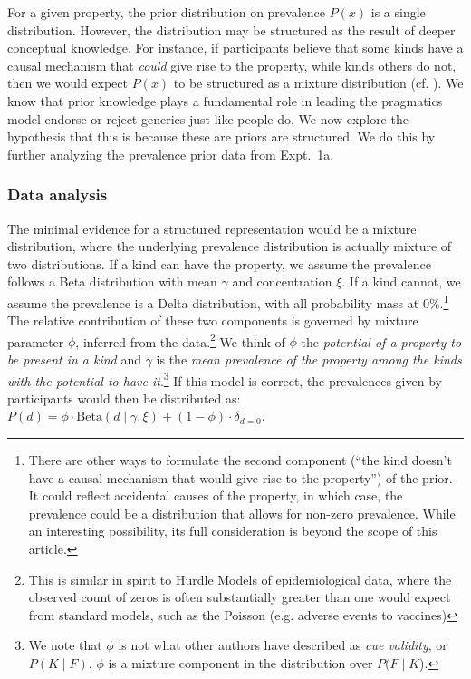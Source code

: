 \documentclass[12pt,letterpaper]{article}
\begin{document}
For a given property,  the prior distribution on prevalence $P(x)$ is a single distribution.
However, the distribution may be structured as the result of deeper conceptual knowledge. 
For instance, if participants believe that some kinds have a causal mechanism that \emph{could} give rise to the property, while kinds others do not, then we would expect $P(x)$ to be structured as a mixture distribution (cf. ).
We know that prior knowledge plays a fundamental role in leading the pragmatics model endorse or reject generics just like people do. 
We now explore the hypothesis that this is because these are priors are structured. 
We do this by further analyzing the prevalence prior data from Expt.~1a.

\subsubsection*{Data analysis}

The minimal evidence for a structured representation would be a mixture distribution, where the underlying prevalence distribution is actually mixture of two distributions. 
If a kind can have the property, we assume the prevalence follows a Beta distribution with mean $\gamma$ and concentration $\xi$. 
If a kind cannot, we assume the prevalence is a Delta distribution, with all probability mass at 0\%.\footnote{There are other ways to formulate the second component (``the kind doesn't have a causal mechanism that would give rise to  the property'') of the prior. 
It could reflect accidental causes of the property, in which case, the prevalence could be a distribution that allows for non-zero prevalence. 
While an interesting possibility, its full consideration is beyond the scope of this article.
}
The relative contribution of these two components is governed by mixture parameter $\phi$, inferred from the data.\footnote{This is similar in spirit to Hurdle Models of epidemiological data, where the observed count of zeros is often substantially greater than one would expect from standard models, such as the Poisson (e.g. adverse events to vaccines)\cite{hurdleModels}}
We think of $\phi$ the \emph{potential of a property to be present in a kind} and $\gamma$ is the \emph{mean prevalence of the property among the kinds with the potential to have it}.\footnote{We note that $\phi$ is not what other authors have described as \emph{cue validity}, or $P(K \mid F)$. 
$\phi$ is a mixture component in the distribution over $P(F\mid K$).
}
If this model is correct, the prevalences given by participants would then be distributed as: $P(d) = \phi \cdot \text{Beta}(d \mid \gamma,\xi)+ (1 - \phi) \cdot \delta_{d=0} $. 
\end{document}
